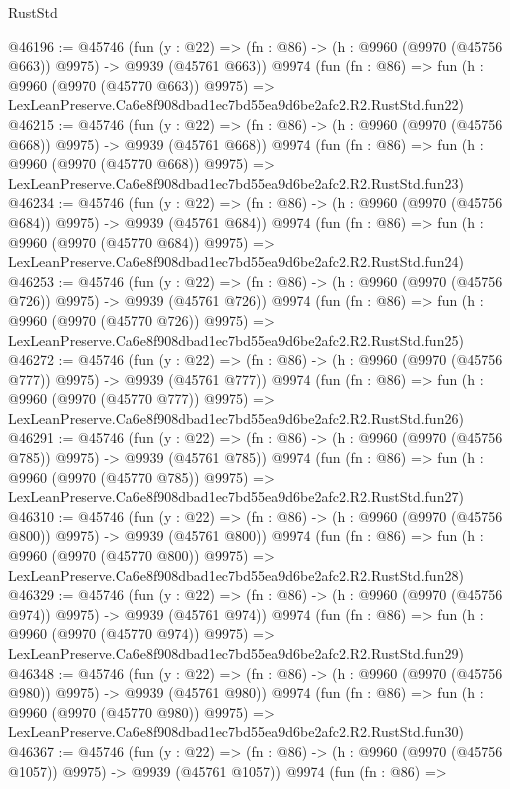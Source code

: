 \begin{lexlean}{RustStd}
\begin{coremodule}
@46196 := @45746
    (fun (y : @22) => (fn : @86) -> (h : @9960 (@9970 (@45756 @663)) @9975) -> @9939 (@45761 @663))
    @9974
    (fun (fn : @86) =>
    fun (h : @9960 (@9970 (@45770 @663)) @9975) =>
    LexLeanPreserve.Ca6e8f908dbad1ec7bd55ea9d6be2afc2.R2.RustStd.fun22)
@46215 := @45746
    (fun (y : @22) => (fn : @86) -> (h : @9960 (@9970 (@45756 @668)) @9975) -> @9939 (@45761 @668))
    @9974
    (fun (fn : @86) =>
    fun (h : @9960 (@9970 (@45770 @668)) @9975) =>
    LexLeanPreserve.Ca6e8f908dbad1ec7bd55ea9d6be2afc2.R2.RustStd.fun23)
@46234 := @45746
    (fun (y : @22) => (fn : @86) -> (h : @9960 (@9970 (@45756 @684)) @9975) -> @9939 (@45761 @684))
    @9974
    (fun (fn : @86) =>
    fun (h : @9960 (@9970 (@45770 @684)) @9975) =>
    LexLeanPreserve.Ca6e8f908dbad1ec7bd55ea9d6be2afc2.R2.RustStd.fun24)
@46253 := @45746
    (fun (y : @22) => (fn : @86) -> (h : @9960 (@9970 (@45756 @726)) @9975) -> @9939 (@45761 @726))
    @9974
    (fun (fn : @86) =>
    fun (h : @9960 (@9970 (@45770 @726)) @9975) =>
    LexLeanPreserve.Ca6e8f908dbad1ec7bd55ea9d6be2afc2.R2.RustStd.fun25)
@46272 := @45746
    (fun (y : @22) => (fn : @86) -> (h : @9960 (@9970 (@45756 @777)) @9975) -> @9939 (@45761 @777))
    @9974
    (fun (fn : @86) =>
    fun (h : @9960 (@9970 (@45770 @777)) @9975) =>
    LexLeanPreserve.Ca6e8f908dbad1ec7bd55ea9d6be2afc2.R2.RustStd.fun26)
@46291 := @45746
    (fun (y : @22) => (fn : @86) -> (h : @9960 (@9970 (@45756 @785)) @9975) -> @9939 (@45761 @785))
    @9974
    (fun (fn : @86) =>
    fun (h : @9960 (@9970 (@45770 @785)) @9975) =>
    LexLeanPreserve.Ca6e8f908dbad1ec7bd55ea9d6be2afc2.R2.RustStd.fun27)
@46310 := @45746
    (fun (y : @22) => (fn : @86) -> (h : @9960 (@9970 (@45756 @800)) @9975) -> @9939 (@45761 @800))
    @9974
    (fun (fn : @86) =>
    fun (h : @9960 (@9970 (@45770 @800)) @9975) =>
    LexLeanPreserve.Ca6e8f908dbad1ec7bd55ea9d6be2afc2.R2.RustStd.fun28)
@46329 := @45746
    (fun (y : @22) => (fn : @86) -> (h : @9960 (@9970 (@45756 @974)) @9975) -> @9939 (@45761 @974))
    @9974
    (fun (fn : @86) =>
    fun (h : @9960 (@9970 (@45770 @974)) @9975) =>
    LexLeanPreserve.Ca6e8f908dbad1ec7bd55ea9d6be2afc2.R2.RustStd.fun29)
@46348 := @45746
    (fun (y : @22) => (fn : @86) -> (h : @9960 (@9970 (@45756 @980)) @9975) -> @9939 (@45761 @980))
    @9974
    (fun (fn : @86) =>
    fun (h : @9960 (@9970 (@45770 @980)) @9975) =>
    LexLeanPreserve.Ca6e8f908dbad1ec7bd55ea9d6be2afc2.R2.RustStd.fun30)
@46367 := @45746
    (fun (y : @22) =>
    (fn : @86) -> (h : @9960 (@9970 (@45756 @1057)) @9975) -> @9939 (@45761 @1057))
    @9974
    (fun (fn : @86) =>

\end{coremodule}
\end{lexlean}
